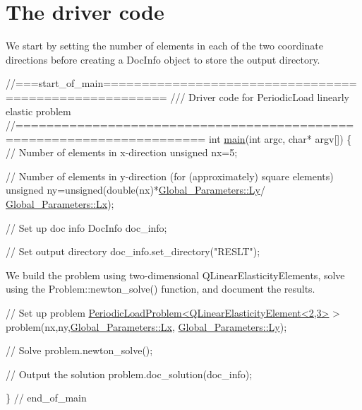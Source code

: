  

\hypertarget{index_main}{}\section{The driver code}\label{index_main}
We start by setting the number of elements in each of the two coordinate directions before creating a {\ttfamily Doc\+Info} object to store the output directory.


\begin{DoxyCodeInclude}
\textcolor{comment}{//===start\_of\_main======================================================}
\textcolor{comment}{/// Driver code for PeriodicLoad linearly elastic problem}
\textcolor{comment}{}\textcolor{comment}{//======================================================================}
\textcolor{keywordtype}{int} \hyperlink{periodic__load_8cc_a0ddf1224851353fc92bfbff6f499fa97}{main}(\textcolor{keywordtype}{int} argc, \textcolor{keywordtype}{char}* argv[]) 
\{
 \textcolor{comment}{// Number of elements in x-direction}
 \textcolor{keywordtype}{unsigned} nx=5;
 
 \textcolor{comment}{// Number of elements in y-direction (for (approximately) square elements)}
 \textcolor{keywordtype}{unsigned} ny=unsigned(\textcolor{keywordtype}{double}(nx)*\hyperlink{namespaceGlobal__Parameters_a25a31b2de3f05ac457b62fc9fa999872}{Global\_Parameters::Ly}/
      \hyperlink{namespaceGlobal__Parameters_a8a81b077f0a29b3468c576f56ecb1348}{Global\_Parameters::Lx});
 
 \textcolor{comment}{// Set up doc info}
 DocInfo doc\_info;
 
 \textcolor{comment}{// Set output directory}
 doc\_info.set\_directory(\textcolor{stringliteral}{"RESLT"});

\end{DoxyCodeInclude}


We build the problem using two-\/dimensional {\ttfamily Q\+Linear\+Elasticity\+Elements}, solve using the {\ttfamily Problem\+::newton\+\_\+solve()} function, and document the results.


\begin{DoxyCodeInclude}
 \textcolor{comment}{// Set up problem}
 \hyperlink{classPeriodicLoadProblem}{PeriodicLoadProblem<QLinearElasticityElement<2,3>} > 
  problem(nx,ny,\hyperlink{namespaceGlobal__Parameters_a8a81b077f0a29b3468c576f56ecb1348}{Global\_Parameters::Lx}, 
      \hyperlink{namespaceGlobal__Parameters_a25a31b2de3f05ac457b62fc9fa999872}{Global\_Parameters::Ly});
 
 \textcolor{comment}{// Solve}
 problem.newton\_solve();
 
 \textcolor{comment}{// Output the solution}
 problem.doc\_solution(doc\_info);
  
\} \textcolor{comment}{// end\_of\_main}

\end{DoxyCodeInclude}




